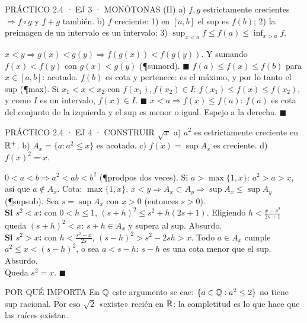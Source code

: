 \begin{enunciado}{PRÁCTICO 2.4 · EJ 3 · MONÓTONAS (II)}
a) $f,g$ estrictamente crecientes $\Rightarrow f\circ g$ y $f+g$ también. b) $f$ creciente: 1) en $[a,b]$ el sup es $f(b)$; 2) la preimagen de un intervalo es un intervalo; 3) $\sup_{x<a}f\le f(a)\le\inf_{x>a}f$.
\end{enunciado}
$x<y\Rightarrow g(x)<g(y)\Rightarrow f(g(x))<f(g(y))$. Y sumando $f(x)<f(y)$ con $g(x)<g(y)$ (\P{sumord}). $\blacksquare$
$f(a)\le f(x)\le f(b)$ para $x\in[a,b]$: acotado. $f(b)$ es cota y pertenece: es el máximo, y por lo tanto el sup (\P{max}).
Si $x_1<x<x_2$ con $f(x_1),f(x_2)\in I$: $f(x_1)\le f(x)\le f(x_2)$, y como $I$ es un intervalo, $f(x)\in I$. $\blacksquare$
$x<a\Rightarrow f(x)\le f(a)$: $f(a)$ es cota del conjunto de la izquierda y el sup es menor o igual. Espejo a la derecha. $\blacksquare$

\begin{enunciado}{PRÁCTICO 2.4 · EJ 4 · CONSTRUIR $\sqrt x$}
a) $a^2$ es estrictamente creciente en $\mathbb{R}^+$. b) $A_x=\{a:a^2\le x\}$ es acotado. c) $f(x)=\sup A_x$ es creciente. d) $f(x)^2=x$.
\end{enunciado}
$0<a<b\Rightarrow a^2<ab<b^2$ (\P{prodpos} dos veces).
Si $a>\max\{1,x\}$: $a^2>a>x$, así que $a\notin A_x$. Cota: $\max\{1,x\}$.
$x<y\Rightarrow A_x\subset A_y\Rightarrow\sup A_x\le\sup A_y$ (\P{supsub}).
Sea $s=\sup A_x$ con $x>0$ (entonces $s>0$).\\
\textbf{Si $s^2<x$:} con $0<h\le1$, $(s+h)^2\le s^2+h(2s+1)$. Eligiendo $h<\frac{x-s^2}{2s+1}$ queda $(s+h)^2<x$: $s+h\in A_x$ y supera al sup. Absurdo.\\
\textbf{Si $s^2>x$:} con $h<\frac{s^2-x}{2s}$, $(s-h)^2>s^2-2sh>x$. Todo $a\in A_x$ cumple $a^2\le x<(s-h)^2$, o sea $a<s-h$: $s-h$ es una cota menor que el sup. Absurdo.\\
Queda $s^2=x$. $\blacksquare$
\begin{tip}{POR QUÉ IMPORTA}
En $\mathbb{Q}$ este argumento se cae: $\{a\in\mathbb{Q}:a^2\le2\}$ no tiene sup racional. Por eso $\sqrt2$ «existe» recién en $\mathbb{R}$: la completitud es lo que hace que las raíces existan.
\end{tip}
